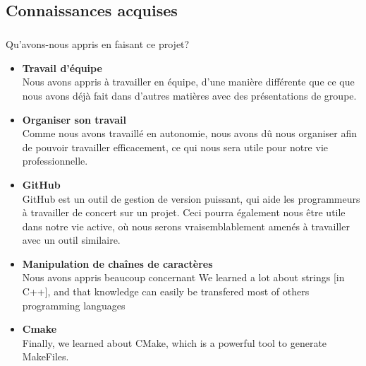 \documentclass[12pt,a4paper,twoside]{article}
\begin{document}
		\subsection{Connaissances acquises} %
			\subparagraph*{}
				Qu'avons-nous appris en faisant ce projet?
				\begin{itemize}
					\item{} \textbf{Travail d'équipe}\\
						Nous avons appris à travailler en équipe, d'une manière différente que ce que nous avons déjà fait dans d'autres matières avec des présentations de groupe.
					\item{} \textbf{Organiser son travail}\\
						Comme nous avons travaillé en autonomie, nous avons dû nous organiser afin de pouvoir travailler efficacement, ce qui nous sera utile pour notre vie professionnelle.
					\item{} \textbf{GitHub}\\
						GitHub est un outil de gestion de version puissant, qui aide les programmeurs à travailler de concert sur un projet. Ceci pourra également nous être utile dans notre vie active, où nous serons vraisemblablement amenés à travailler avec un outil similaire.
					\item{} \textbf{Manipulation de chaînes de caractères}\\
						Nous avons appris beaucoup concernant 
						We learned a lot about strings [in C++], and that knowledge can easily be transfered most of others programming languages
					\item{} \textbf{Cmake}\\
						Finally, we learned about CMake, which is a powerful tool to generate MakeFiles.
				\end{itemize}
\end{document}
